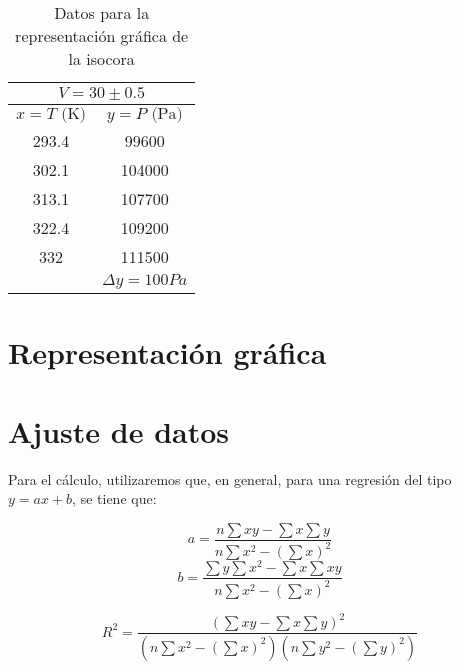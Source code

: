 \documentclass[a4paper,12pt]{article}
\begin{document}
\begin{table}[H]
\centering
  \caption{Datos para la representación gráfica de la isocora}
  \begin{tabular}{|c|c|}
    \hline
    \multicolumn{2}{|c|}{$V = 30 \pm 0.5$}         \\\hline
    $x = T \text{ (K)}$  & $y = P \text{ (Pa)} $ \\\hline
    293.4                & 99600                 \\\hline
    302.1                & 104000                \\\hline
    313.1                & 107700                \\\hline
    322.4                & 109200                \\\hline
    332                  & 111500                \\\hline
    \multicolumn{1}{|c|}{} & $\Delta y = 100 Pa$\\ \hline  
  \end{tabular}
\end{table}

\section{Representación gráfica}
\pagebreak

\section{Ajuste de datos}
Para el cálculo, utilizaremos que, en general, para una regresión del tipo $y = ax + b$, se tiene que:

\begin{equation}
  a = \frac{n\sum x y - \sum x \sum y}{n \sum x^2 - \left(\sum x\right)^2}
\end{equation}
\begin{equation}
  b = \frac{\sum y \sum x^2 - \sum x \sum x y}{n\sum x^2 - \left(\sum x \right)^2}
\end{equation}

\begin{equation}
R^2=\frac{\left(\sum x y -\sum x \sum y\right)^2}{\left(n\sum x^2 - \left(\sum x\right)^2\right)\left(n\sum y^2 - \left(\sum y\right)^2\right)} 
\end{equation}
\end{document}
